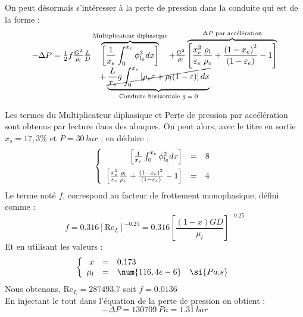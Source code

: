 On peut désormais s'intéresser à la perte de pression dans la conduite qui est de la forme : 
\begin{equation}
\begin{array}{c}
-\Delta P=\frac{1}{2} f \frac{G^{2}}{\rho_{l}} \frac{L}{D} \overbrace{\left[\frac{1}{x_{e}} \int_{0}^{x_{e}} \phi_{l_{0}}^{2} d x\right]}^{\text{Multiplicateur diphasique}}+\frac{G^{2}}{\rho_{l}}\overbrace{\left[\frac{x_{e}^{2}}{\varepsilon_{e}} \frac{\rho_{l}}{\rho_{v}}+\frac{\left(1-x_{e}\right)^{2}}{\left(1-\varepsilon_{e}\right)}-1\right]}^{\Delta P\text{ par accélération}} \\
+\underbrace{\cancel{\frac{L}{x_{e}} g \int_{0}^{x_{e}}\left[\rho_{v} \varepsilon+\rho_{l}(1-\varepsilon)\right] d x}}_{\text{Conduite horizontale $g=0$}}
\end{array}
\end{equation}

Les termes du \og Multiplicateur diphasique \fg{} et \og Perte de pression par accélération \fg{} sont obtenus par lecture dans des abaques. On peut alors, avec le titre en sortie $x_s=17,3\%$ et $P = 30 ~ \si{bar}$ , en déduire :
\begin{equation}
    \left\{
    \begin{array}{r c l}
    \left[\frac{1}{x_{e}} \int_{0}^{x_{e}} \phi_{l_{0}}^{2} d x\right] &=& 8 \\[2ex]
    \left[\frac{x_{e}^{2}}{\varepsilon_{e}} \frac{\rho_{l}}{\rho_{v}}+\frac{\left(1-x_{e}\right)^{2}}{\left(1-\varepsilon_{e}\right)}-1\right] &=& 4 \\
    \end{array}
    \right.    
\end{equation}
Le terme  noté $f$, correspond au facteur de frottement monophasique, défini comme :
\begin{equation}
    f=0.316\left[\text{Re}_L \right]^{-0.25} = 0.316\left[\frac{(1-x) G D}{\mu_l} \right]^{-0.25}
\end{equation}
Et en utilisant les valeurs :
\begin{equation}
    \left\{
    \begin{array}{r c l l}
    x &=& 0.173 & \\
    \mu_l &=& \num{116,4e-6} &\si{Pa.s}
    \end{array}
    \right.    
\end{equation}
Nous obtenons, $\text{Re}_L = \num{287493,7}$ soit $f = \num{0,0136}$\\

En injectant le tout dans l'équation de la perte de pression on obtient :
\begin{equation}
    \boxed{
    -\Delta P = \num{130709} ~\si{Pa} = 1.31 ~\si{bar}
    }
\end{equation}